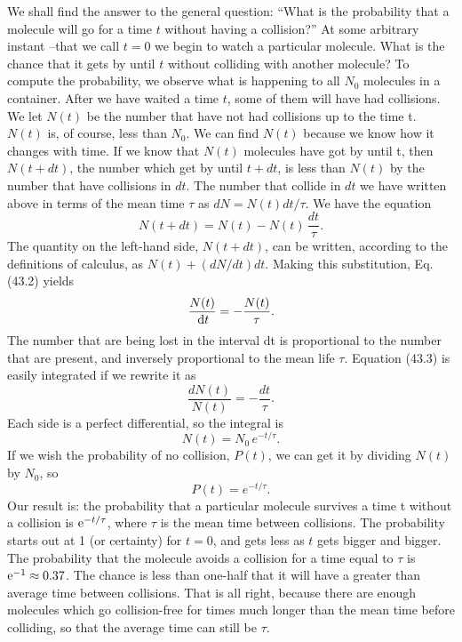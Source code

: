 \begin{subappendices}
We shall find the answer to the general question: ``What is the probability that a molecule will go for a time $t$ without having a collision?'' At some arbitrary instant --that we call $t=0$ we begin to watch a particular molecule. What is the chance that it gets by until $t$ without colliding with another molecule? To compute the probability, we observe what is happening to all $N_{0}$ molecules in a container. After we have waited a time $t$, some of them will have had collisions. We let $N(t)$ be the number that have not had collisions up to the time t. $N(t)$ is, of course, less than $N_{0}$. We can find $N(t)$ because we know how it changes with time. If we know that $N(t)$ molecules have got by until t, then $N(t+dt)$, the number which get by until $t+dt$, is less than $N(t)$ by the number that have collisions in $dt$. The number that collide in $dt$ we have written above in terms of the mean time $\tau$ as $dN=N(t)dt/\tau$. We have the equation
%
\begin{equation}
\label{Eq:I:43:2}
N(t + dt) = N(t) - N(t)\,\frac{dt}{\tau}.
\end{equation}
%
The quantity on the left-hand side, $N(t+dt)$, can be written, according to the definitions of calculus, as $N(t)+(dN/dt)dt$. Making this substitution, Eq. (43.2) yields
\begin{equation}
\label{Eq:I:43:3}
\frac{N(t)}{\,\mathrm{d} t} = -\frac{N(t)}{\tau}.
\end{equation}
%
The number that are being lost in the interval dt is proportional to the number that are present, and inversely proportional to the mean life $\tau$. Equation (43.3) is easily integrated if we rewrite it as
\begin{equation}
\label{Eq:I:43:4}
\frac{dN(t)}{N(t)} = -\frac{dt}{\tau}.
\end{equation}
Each side is a perfect differential, so the integral is
\begin{equation}
\label{Eq:I:43:7}
N(t) = N_{0}\, e^{-t/\tau}.
\end{equation}
If we wish the probability of no collision, $P(t)$, we can get it by dividing $N(t)$ by $N_{0}$, so
\begin{equation}
\label{Eq:I:43:8}
P(t) = e^{-t/\tau}.
\end{equation}
Our result is: the probability that a particular molecule survives a time t without a collision is $\mathrm{e}^{-t/\tau}$, where $\tau$ is the mean time between collisions. The probability starts out at 1 (or certainty) for $t=0$, and gets less as $t$ gets bigger and bigger. The probability that the molecule avoids a collision for a time equal to $\tau$ is $\mathrm{e}^{-1} \approx 0.37$. The chance is less than one-half that it will have a greater than average time between collisions. That is all right, because there are enough molecules which go collision-free for times much longer than the mean time before colliding, so that the average time can still be $\tau$.


\end{subappendices}
